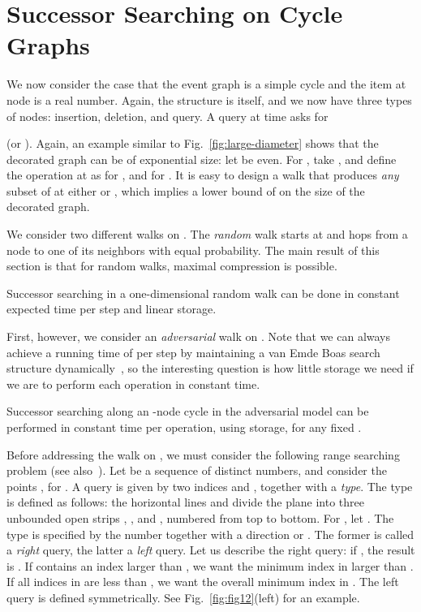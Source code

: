\documentclass[oribibl,envcountsect,envcountsame]{llncs}
\begin{document}
\section{Successor Searching on Cycle Graphs}\label{1D}

We now consider the case that the 
event graph  is a simple cycle  and 
the item  at node  is a real number.
Again, the structure  is  itself,
and we now have three types of nodes: 
insertion, deletion, and query.
A query at time  asks for 

(or ).
Again, an example similar to Fig.~\ref{fig:large-diameter}
shows that the decorated graph can be
of exponential size: let  be even. For , 
take ,
and define the operation at  as
 for ,
and  for .
It is easy to design a walk
that produces \emph{any} subset
of  at either  or ,
which 
implies a lower bound of  on
the size of the decorated graph.

We consider two different walks on .
The \emph{random} walk starts at  and hops from a node to 
one of its neighbors with equal probability.
The main result of this section is that for random walks,  maximal compression
is possible.


\begin{theorem}\label{markov-cycle}
Successor searching in a one-dimensional random
walk can be done in constant expected time per step
and linear storage.
\end{theorem}

First, however, we consider an \emph{adversarial} walk on .
Note that we can always achieve a running time of  per step
by maintaining a van Emde Boas search structure 
dynamically~\cite{vEmdeBoasKaZi76,vEmdeBoas77}, 
so the interesting question is how little storage
we need if we are to perform each operation in constant time.


\begin{theorem}\label{adversarial-cycle}
Successor searching along an -node cycle in the adversarial model
can be performed in constant time per operation, using
 storage, for any fixed .
\end{theorem}

Before addressing the walk on , we must consider
the following range searching problem (see also~\cite{CrochemoreIlKuRaWa12}).
Let  be a sequence of  distinct numbers, and
consider the points ,  for .
A query is given by two indices  and , together with a \emph{type}.
The type is defined as follows:  
the horizontal lines  and  divide the
plane into three unbounded open strips , , and , numbered from
top to bottom.  For , let 
.
The type is specified by the number  together with
a direction  or . The former is called 
a \emph{right} query, the latter a \emph{left} query.
Let us describe the right query: if , the 
result is .  If  contains an index larger than , 
we want the minimum index in  larger than .  If all indices in  
are less than , we want the overall minimum index in .
The left query is defined symmetrically.
See Fig.~\ref{fig:fig12}(left) for an example.
\end{document}
